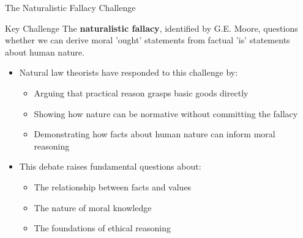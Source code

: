 \documentclass{beamer}
\begin{document}
\begin{frame}{The Naturalistic Fallacy Challenge}
    \begin{alertblock}{Key Challenge}
        The \textbf{naturalistic fallacy}, identified by G.E. Moore, questions whether we can derive moral 'ought' statements from factual 'is' statements about human nature.
    \end{alertblock}

    \begin{itemize}
        \item Natural law theorists have responded to this challenge by:
        \begin{itemize}
            \item Arguing that practical reason grasps basic goods directly
            \item Showing how nature can be normative without committing the fallacy
            \item Demonstrating how facts about human nature can inform moral reasoning
        \end{itemize}
        
        \item This debate raises fundamental questions about:
        \begin{itemize}
            \item The relationship between facts and values
            \item The nature of moral knowledge
            \item The foundations of ethical reasoning
        \end{itemize}
    \end{itemize}
\end{frame}
\end{document}
